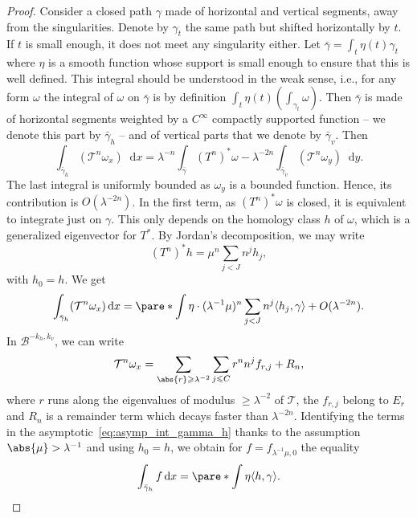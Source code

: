 \documentclass[11pt, a4paper, oneside, final, pagebackref]{amsart}
\newcommand{\boB}{\mathcal{B}}
\newcommand{\boT}{\mathcal{T}}
\newcommand{\dd}{\mathop{}\!\mathrm{d}}
\renewcommand{\leq}{\leqslant}
\renewcommand{\geq}{\geqslant}
\theoremstyle{definition}
\numberwithin{equation}{section}
\begin{document}
\begin{proof}
Consider a closed path $\gamma$ made of horizontal and vertical segments,
away from the singularities. Denote by $\gamma_t$ the same path but shifted
horizontally by $t$. If $t$ is small enough, it does not meet any singularity
either. Let $\bar\gamma = \int_t \eta(t) \gamma_t$ where $\eta$ is a smooth
function whose support is small enough to ensure that this is well defined.
This integral should be understood in the weak sense, i.e., for any form
$\omega$ the integral of $\omega$ on $\bar\gamma$ is by definition $\int_t
\eta(t) (\int_{\gamma_t} \omega)$. Then $\bar \gamma$ is made of horizontal
segments weighted by a $C^\infty$ compactly supported function -- we denote
this part by $\bar\gamma_h$ -- and of vertical parts that we denote by $\bar
\gamma_v$. Then
\begin{equation*}
  \int_{\bar \gamma_h} (\boT^n \omega_x) \dd x = \lambda^{-n} \int_{\bar\gamma} (T^n)^* \omega -
  \lambda^{-2n} \int_{\bar \gamma_v} (\boT^n \omega_y) \dd y.
\end{equation*}
The last integral is uniformly bounded as $\omega_y$ is a bounded function.
Hence, its contribution is $O(\lambda^{-2n})$. In the first term, as $(T^n)^*
\omega$ is closed, it is equivalent to integrate just on $\gamma$. This only
depends on the homology class $h$ of $\omega$, which is a generalized
eigenvector for $T^*$. By Jordan's decomposition, we may write
\begin{equation*}
  (T^n)^* h = \mu^n \sum_{j < J} n^j h_j,
\end{equation*}
with $h_0 = h$. We get
\begin{equation}
\label{eq:asymp_int_gamma_h}
  \int_{\bar \gamma_h} (\boT^n \omega_x) \dd x = \pare*{\int \eta} \cdot (\lambda^{-1}\mu)^n \sum_{j< J} n^j \langle h_j, \gamma \rangle + O(\lambda^{-2n}).
\end{equation}
In $\boB^{-k_h, k_v}$, we can write
\begin{equation*}
  \boT^n \omega_x =
  \sum_{\abs{r}\geq \lambda^{-2}} \sum_{j \leq C} r^n n^j f_{r,j}
  + R_n,
\end{equation*}
where $r$ runs along the eigenvalues of modulus $\geq \lambda^{-2}$ of
$\boT$, the $f_{r,j}$ belong to $E_r$ and $R_n$ is a remainder term which
decays faster than $\lambda^{-2n}$. Identifying the terms in the
asymptotic~\eqref{eq:asymp_int_gamma_h} thanks to the assumption $\abs{\mu} >
\lambda^{-1}$ and using $h_0= h$, we obtain for $f=f_{\lambda^{-1}\mu,0}$ the
equality
\begin{equation}
\label{eq:bargammah}
  \int_{\bar\gamma_h} f \dd x = \pare*{\int \eta} \langle h, \gamma \rangle.
\end{equation}


\end{proof}
\end{document}

